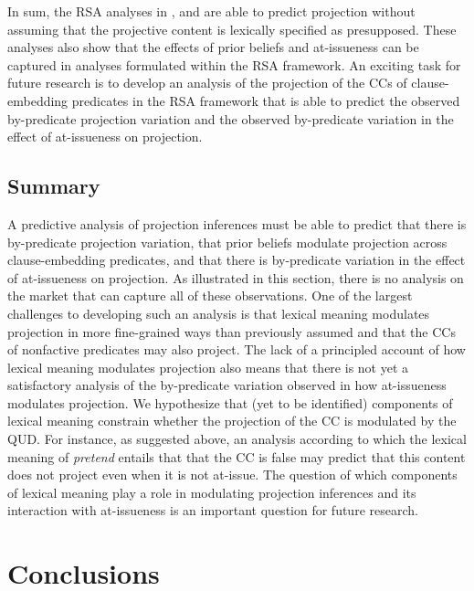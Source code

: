 \documentclass[11pt,fleqn]{article}
\newcommand{\6}{\mbox{$[\hspace*{-.6mm}[$}}
\newcommand{\9}{\mbox{$]\hspace*{-.6mm}]$}}
\begin{document}
\bigskip

In sum, the RSA analyses in \cite{qing-etal2016}, \cite{warstadt2022} and \cite{scontras-tonhauser2025} are able to predict projection without assuming that the projective content is lexically specified as presupposed. These analyses also show that the effects of prior beliefs and at-issueness can be captured in analyses formulated within the RSA framework. An exciting task for future research is to develop an analysis of the projection of the CCs of clause-embedding predicates in the RSA framework that is able to predict the observed by-predicate projection variation and the observed by-predicate variation in the effect of at-issueness on projection.


\subsection{Summary}

A predictive analysis of projection inferences must be able to predict that there is by-predicate projection variation, that prior beliefs modulate projection across clause-embedding predicates, and that there is by-predicate variation in the effect of at-issueness on projection. As illustrated in this section, there is no analysis on the market that can capture all of these observations. One of the largest challenges to developing such an analysis is that lexical meaning modulates projection in more fine-grained ways than previously assumed and that the CCs of nonfactive predicates may also project. The lack of a principled account of how lexical meaning modulates projection also means that there is not yet a satisfactory analysis of the by-predicate variation observed in how at-issueness modulates projection. We hypothesize that (yet to be identified) components of lexical meaning constrain whether the projection of the CC  is modulated by the QUD. For instance, as suggested above, an analysis according to which the lexical meaning of {\em pretend} entails that that the CC is false may predict that this content does not project even when it is not at-issue. The question of which components of lexical meaning play a role in modulating projection inferences and its interaction with at-issueness is an important question for future research.


\section{Conclusions}\label{s5}
\end{document}
